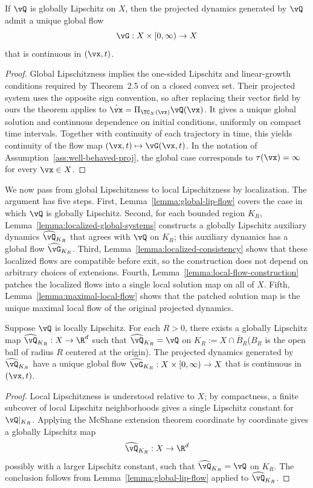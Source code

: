 \begin{lemma}\label{lemma:global-lip-flow}
If $\vQ$ is globally Lipschitz on $X$, then the projected dynamics generated by
$\vQ$ admit a unique global flow
\[
\vG:X\times[0,\infty)\to X
\]
that is continuous in $(\vx,t)$.
\end{lemma}
\begin{proof}
Global Lipschitzness implies the one-sided Lipschitz and linear-growth
conditions required by Theorem~2.5 of \citet{nagurney2012projected} on a closed
convex set. Their projected system uses the opposite sign convention, so after
replacing their vector field by ours the theorem applies to
$\dot \vx=\Pi_{\TC_X(\vx)}\vQ(\vx)$. It gives a unique global solution and
continuous dependence on initial conditions, uniformly on compact time
intervals. Together with continuity of each trajectory in time, this yields
continuity of the flow map $(\vx,t)\mapsto \vG(\vx,t)$. In the notation of
Assumption~\ref{ass:well-behaved-proj}, the global case corresponds to
$\tau(\vx)=\infty$ for every $\vx\in X$.
\end{proof}

We now pass from global Lipschitzness to local Lipschitzness by localization.
The argument has five steps. First, Lemma~\ref{lemma:global-lip-flow} covers the
case in which $\vQ$ is globally Lipschitz. Second, for each bounded region
$K_R$, Lemma~\ref{lemma:localized-global-systems} constructs a globally
Lipschitz auxiliary dynamics $\widehat{\vQ}_{K_R}$ that agrees with $\vQ$ on
$K_R$; this auxiliary dynamics has a global flow
$\widehat{\vG}_{K_R}$. Third, Lemma~\ref{lemma:localized-consistency} shows that
these localized flows are compatible before exit, so the construction does not
depend on arbitrary choices of extensions. Fourth,
Lemma~\ref{lemma:local-flow-construction} patches the localized flows into a
single local solution map on all of $X$. Fifth,
Lemma~\ref{lemma:maximal-local-flow} shows that the patched solution map is the
unique maximal local flow of the original projected dynamics.

\begin{lemma}\label{lemma:localized-global-systems}
Suppose $\vQ$ is locally Lipschitz. For each $R>0$, there exists a globally
Lipschitz map $\widehat{\vQ}_{K_R}:X\to\R^d$ such that
$\widehat{\vQ}_{K_R}=\vQ$ on $K_R:=X\cap\overline B_R$($B_R$ is the open ball of radius $R$ centered at the origin). The projected dynamics
generated by $\widehat{\vQ}_{K_R}$ have a unique global flow
$\widehat{\vG}_{K_R}:X\times[0,\infty)\to X$ that is continuous in $(\vx,t)$.
\end{lemma}
\begin{proof}
Local Lipschitzness is understood relative to $X$; by compactness, a finite
subcover of local Lipschitz neighborhoods gives a single Lipschitz constant for
$\vQ|_{K_R}$. Applying the McShane extension theorem coordinate by coordinate
gives a globally Lipschitz map
\[
\widehat{\vQ}_{K_R}:X\to\R^d
\]
possibly with a larger Lipschitz constant, such that
$\widehat{\vQ}_{K_R}=\vQ$ on $K_R$. The conclusion follows from
Lemma~\ref{lemma:global-lip-flow} applied to $\widehat{\vQ}_{K_R}$.
\end{proof}

